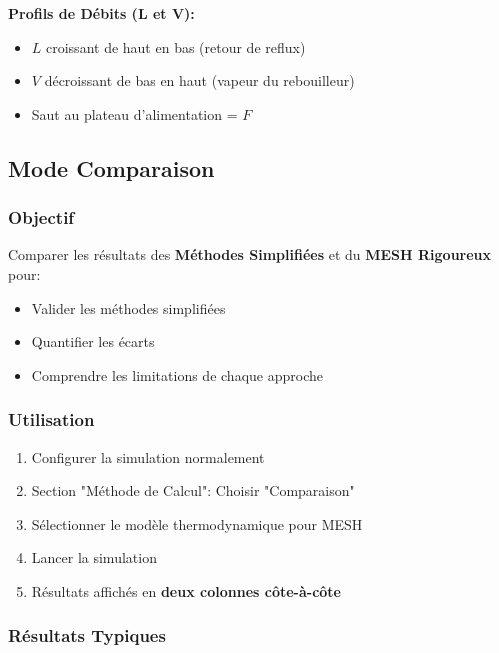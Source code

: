 \documentclass[11pt,a4paper]{article}
\begin{document}
\textbf{Profils de Débits (L et V):}

\begin{itemize}[leftmargin=*]
    \item $L$ croissant de haut en bas (retour de reflux)
    \item $V$ décroissant de bas en haut (vapeur du rebouilleur)
    \item Saut au plateau d'alimentation = $F$
\end{itemize}

\subsection{Mode Comparaison}

\subsubsection{Objectif}

Comparer les résultats des \textbf{Méthodes Simplifiées} et du \textbf{MESH Rigoureux} pour:

\begin{itemize}[leftmargin=*]
    \item Valider les méthodes simplifiées
    \item Quantifier les écarts
    \item Comprendre les limitations de chaque approche
\end{itemize}

\subsubsection{Utilisation}

\begin{enumerate}[leftmargin=*]
    \item Configurer la simulation normalement
    \item Section "Méthode de Calcul": Choisir "Comparaison"
    \item Sélectionner le modèle thermodynamique pour MESH
    \item Lancer la simulation
    \item Résultats affichés en \textbf{deux colonnes côte-à-côte}
\end{enumerate}

\subsubsection{Résultats Typiques}
\end{document}
